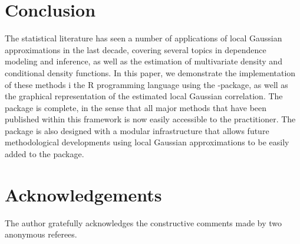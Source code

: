 \section{Conclusion} 

The statistical literature has seen a number of applications of local Gaussian approximations in the last decade, covering several topics in dependence modeling and inference, as well as the estimation of multivariate density and conditional density functions. In this paper, we demonstrate the implementation of these methods i the R programming language using the -package, as well as the graphical representation of the estimated local Gaussian correlation. The package is complete, in the sense that all major methods that have been published within this framework is now easily accessible to the practitioner. The package is also designed with a modular infrastructure that allows future methodological developments using local Gaussian approximations to be easily added to the package. 

\section{Acknowledgements}

The author gratefully acknowledges the constructive comments made by two anonymous referees.



\address{H{\aa}kon Otneim\\
  Department of Business and Management Science, \\
  NHH Norwegian School of Economics, \\
  Helleveien 30, 5045 BERGEN\\
  Norway\\
  ORCID: 0000-0002-6004-0237\\
  }

